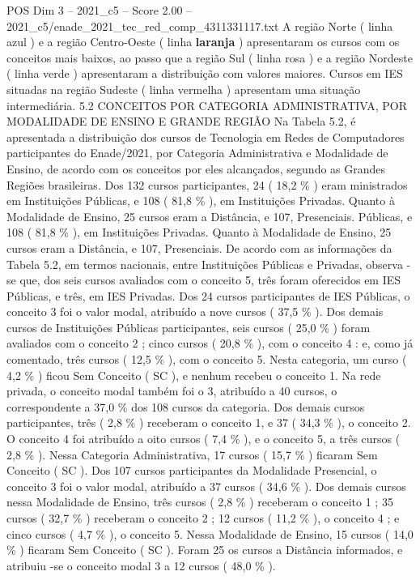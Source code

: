 \begin{textsample}{POS Dim 3 – 2021\_c5 – Score 2.00 – 2021\_c5/enade\_2021\_tec\_red\_comp\_4311331117.txt}
A região Norte ( linha azul ) e a região Centro-Oeste ( linha \textbf{laranja} ) apresentaram os cursos com os conceitos mais baixos, ao passo que a região Sul ( linha rosa ) e a região Nordeste ( linha verde ) apresentaram a distribuição com valores maiores.
Cursos em IES situadas na região Sudeste ( linha vermelha ) apresentam uma situação intermediária. 5.2 CONCEITOS POR CATEGORIA ADMINISTRATIVA, POR MODALIDADE DE ENSINO E GRANDE REGIÃO Na Tabela 5.2, é apresentada a distribuição dos cursos de Tecnologia em Redes de Computadores participantes do Enade/2021, por Categoria Administrativa e Modalidade de Ensino, de acordo com os conceitos por eles alcançados, segundo as Grandes Regiões brasileiras.
Dos 132 cursos participantes, 24 ( 18,2 \% ) eram ministrados em Instituições Públicas, e 108 ( 81,8 \% ), em Instituições Privadas.
Quanto à Modalidade de Ensino, 25 cursos eram a Distância, e 107, Presenciais.
Públicas, e 108 ( 81,8 \% ), em Instituições Privadas.
Quanto à Modalidade de Ensino, 25 cursos eram a Distância, e 107, Presenciais.
De acordo com as informações da Tabela 5.2, em termos nacionais, entre Instituições Públicas e Privadas, observa -se que, dos seis cursos avaliados com o conceito 5, três foram oferecidos em IES Públicas, e três, em IES Privadas.
Dos 24 cursos participantes de IES Públicas, o conceito 3 foi o valor modal, atribuído a nove cursos ( 37,5 \% ).
Dos demais cursos de Instituições Públicas participantes, seis cursos ( 25,0 \% ) foram avaliados com o conceito 2 ; cinco cursos ( 20,8 \% ), com o conceito 4 : e, como já comentado, três cursos ( 12,5 \% ), com o conceito 5.
Nesta categoria, um curso ( 4,2 \% ) ficou Sem Conceito ( SC ), e nenhum recebeu o conceito 1.
Na rede privada, o conceito modal também foi o 3, atribuído a 40 cursos, o correspondente a 37,0 \% dos 108 cursos da categoria.
Dos demais cursos participantes, três ( 2,8 \% ) receberam o conceito 1, e 37 ( 34,3 \% ), o conceito 2.
O conceito 4 foi atribuído a oito cursos ( 7,4 \% ), e o conceito 5, a três cursos ( 2,8 \% ).
Nessa Categoria Administrativa, 17 cursos ( 15,7 \% ) ficaram Sem Conceito ( SC ).
Dos 107 cursos participantes da Modalidade Presencial, o conceito 3 foi o valor modal, atribuído a 37 cursos ( 34,6 \% ).
Dos demais cursos nessa Modalidade de Ensino, três cursos ( 2,8 \% ) receberam o conceito 1 ; 35 cursos ( 32,7 \% ) receberam o conceito 2 ; 12 cursos ( 11,2 \% ), o conceito 4 ; e cinco cursos ( 4,7 \% ), o conceito 5.
Nessa Modalidade de Ensino, 15 cursos ( 14,0 \% ) ficaram Sem Conceito ( SC ).
Foram 25 os cursos a Distância informados, e atribuiu -se o conceito modal 3 a 12 cursos ( 48,0 \% ).

\end{textsample}
